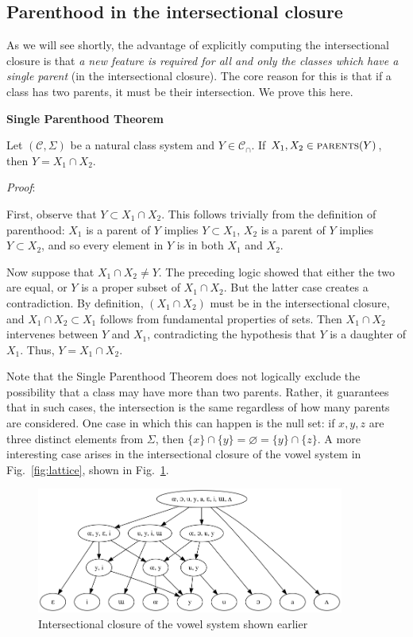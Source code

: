 \documentclass[11pt, oneside]{article}   	%
\begin{document}
\subsection{Parenthood in the intersectional closure}

As we will see shortly, the advantage of explicitly computing the intersectional closure is that \textit{a new feature is required for all and only the classes which have a single parent} (in the intersectional closure). The core reason for this is that if a class has two parents, it must be their intersection. We prove this here.

\vspace{\baselineskip} \noindent \textbf{Single Parenthood Theorem}

Let $(\mathcal C, \Sigma)$ be a natural class system and $Y \in \mathcal C_\cap$. If $X_1, X_2 \in \textsc{parents}(Y)$, then $Y = X_1 \cap X_2$.

\vspace{\baselineskip} \noindent \textit{Proof}:

First, observe that $Y \subset X_1 \cap X_2$. This follows trivially from the definition of parenthood: $X_1$ is a parent of $Y$ implies $Y \subset X_1$, $X_2$ is a parent of $Y$ implies $Y \subset X_2$, and so every element in $Y$ is in both $X_1$ and $X_2$.

Now suppose that $X_1 \cap X_2 \neq Y$. The preceding logic showed that either the two are equal, or $Y$ is a proper subset of  $X_1 \cap X_2$. But the latter case creates a contradiction. By definition, $(X_1 \cap X_2)$ must be in the intersectional closure, and $X_1 \cap X_2 \subset X_1$ follows from fundamental properties of sets. Then $X_1 \cap X_2$ intervenes between $Y$ and $X_1$, contradicting the hypothesis that $Y$ is a daughter of $X_1$. Thus, $Y = X_1 \cap X_2$.
	
\vspace{\baselineskip} Note that the Single Parenthood Theorem does not logically exclude the possibility that a class may have more than two parents. Rather, it guarantees that in such cases, the intersection is the same regardless of how many parents are considered. One case in which this can happen is the null set: if $x, y, z$ are three distinct elements from $\Sigma$, then $\{ x \} \cap \{ y \} = \varnothing = \{ y \} \cap \{ z \}$. A more interesting case arises in the intersectional closure of the vowel system in Fig.~\ref{fig:lattice}, shown in Fig.~\ref{fig:closure}. 

\begin{figure}[h]
\includegraphics[width=0.9\textwidth]{vowelHarmony_closure.png}
\caption{Intersectional closure of the vowel system shown earlier}
\label{fig:closure}
\end{figure}
\end{document}
